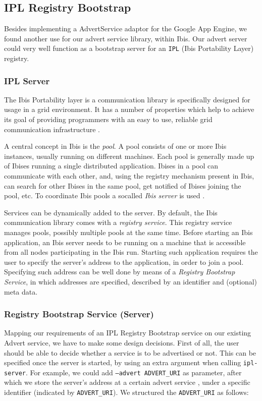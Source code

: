 \subsection{IPL Registry Bootstrap}
\label{ipl}
Besides implementing a AdvertService adaptor for the Google App Engine, we
found another use for our advert service library, within Ibis. Our advert
server could very well function as a bootstrap server for an \texttt{IPL} (Ibis
Portability Layer) \cite{ipl-www} registry.

\subsubsection{IPL Server}
The Ibis Portability layer is a communication library is specifically
designed for usage in a grid environment. It has a number of properties which
help to achieve its goal of providing programmers with an easy to use, reliable
grid communication infrastructure \cite{ipl-www}.

A central concept in Ibis is the \emph{pool}. A pool consists of one or more Ibis
instances, usually running on different machines. Each pool is generally made up
of Ibises running a single distributed application. Ibises in a pool can
communicate with each other, and, using the registry mechanism present in Ibis,
can search for other Ibises in the same pool, get notified of Ibises joining the
pool, etc. To coordinate Ibis pools a socalled \emph{Ibis server} is used
\cite{ipl-usersguide}.

Services can be dynamically added to the server. By default, the Ibis
communication library comes with a \emph{registry service}. This registry
service manages pools, possibly multiple pools at the same time. Before starting
an Ibis application, an Ibis server needs to be running on a machine that is
accessible from all nodes participating in the Ibis run. Starting such
application requires the user to specify the server's address to the
application, in order to join a pool. Specifying such address can be well done
by means of a \emph{Registry Bootstrap Service}, in which addresses are
specified, described by an identifier and (optional) meta data.

\subsubsection{Registry Bootstrap Service (Server)}
Mapping our requirements of an IPL Registry Bootstrap service on our existing
Advert service, we have to make some design decisions. First of all, the user
should be able to decide whether a service is to be advertised or not. This can
be specified once the server is started, by using an extra argument when calling
\texttt{ipl-server}. For example, we could add \texttt{--advert ADVERT\_URI} as
parameter, after which we store the server's address at a certain advert service
, under a specific identifier (indicated by \texttt{ADVERT\_URI}). We structured
the \texttt{ADVERT\_URI} as follows:

